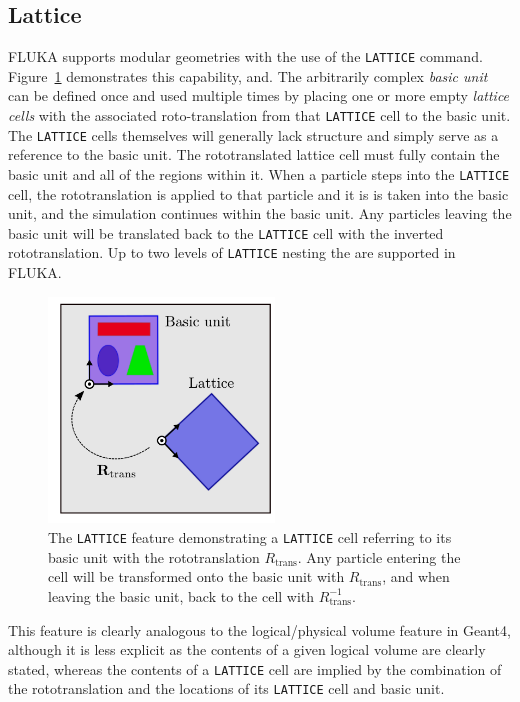 \documentclass[final,5p,times,twocolumn]{elsarticle}
\newcommand{\fluka}[1]{\texttt{\MakeUppercase{#1}}}
\begin{document}
\subsection{Lattice}

FLUKA supports modular geometries with the use of the \fluka{lattice}
command. Figure~\ref{fig:lattice} demonstrates this capability, and. The
arbitrarily complex \emph{basic unit} can be defined once and used
multiple times by placing one or more empty \emph{lattice cells} with the
associated roto-translation from that \fluka{lattice} cell to the basic
unit. The \fluka{lattice} cells themselves will generally lack structure
and simply serve as a reference to the basic unit. The rototranslated
lattice cell must fully contain the basic unit and all of the regions
within it. When a particle steps into the \fluka{lattice} cell, the
rototranslation is applied to that particle and it is is taken into the
basic unit, and the simulation continues within the basic unit. Any
particles leaving the basic unit will be translated back to the
\fluka{lattice} cell with the inverted rototranslation. Up to two
levels of \fluka{lattice} nesting the are supported in FLUKA.

\begin{figure}[hbtp]
\begin{center}
\includegraphics[width=6cm]{./diagrams/lattice}
\caption{The \fluka{lattice} feature demonstrating a \fluka{lattice} cell
  referring to its basic unit with the rototranslation $R_\textrm{trans}$.
  Any particle entering the cell will be transformed onto the basic unit
  with $R_\textrm{trans}$, and when leaving the basic unit, back to the cell
  with $R_\textrm{trans}^{-1}$.}
\label{fig:lattice}
\end{center}
\end{figure}

This feature is clearly analogous to the logical/physical volume feature in
Geant4, although it is less explicit as the contents of a given logical
volume are clearly stated, whereas the contents of a \fluka{lattice} cell
are implied by the combination of the rototranslation and the locations of
its \fluka{lattice} cell and basic unit.
\end{document}
